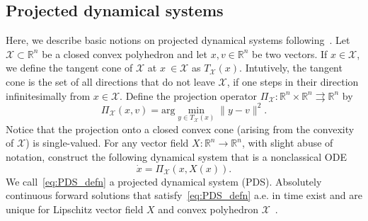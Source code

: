 \documentclass[letterpaper, conference]{ieeeconf}
\newcommand{\X}{\mathcal X}
\newcommand{\1}{\mathbf{1}}
\newcommand{\argmin}[2] {\mathrm{arg}\min_{#1}#2}
\begin{document}
\subsection{Projected dynamical systems}
Here, we describe basic notions on projected dynamical systems following~\cite{PD-AN:93,AN-DZ:96}.
Let \(\X \subset \mathbb R^n\) be a closed convex polyhedron and let \(x, v \in \mathbb R^n\) be two vectors.
If \(x \in \mathcal X\), we define the tangent cone of \(\X\) at \(x\ \in \X\) as \(T_\X (x)\).
Intutively, the tangent cone is the set of all directions that do not leave \(\X\), if one steps in their direction infinitesimally from \(x \in \X\).
Define the projection operator \(\Pi_\mathcal{X}: \mathbb R^n \times \mathbb R^n \rightrightarrows \mathbb R^n\) by
\begin{equation}\label{eq:projection_op}
    \Pi_\mathcal{X}(x, v) = \argmin{y\in T_\mathcal{X}(x)}{\lVert y - v\rVert^2}.
\end{equation}
Notice that the projection onto a closed convex cone (arising from the convexity of \(\X\)) is single-valued. 
For any vector field \(X:\mathbb R^n \rightarrow \mathbb R^n\), with slight abuse of notation, construct the following dynamical system that is a nonclassical ODE
\begin{equation}\label{eq:PDS_defn}
    \dot x = \Pi_\mathcal{X}(x, X(x)).
\end{equation}
We call~\eqref{eq:PDS_defn} a projected dynamical system (PDS).
Absolutely continuous forward solutions that satisfy~\eqref{eq:PDS_defn} a.e. in time exist and are unique for Lipschitz vector field \(X\) and convex polyhedron \(\X\)~\cite[Theorem 2]{PD-AN:93}.
\end{document}
